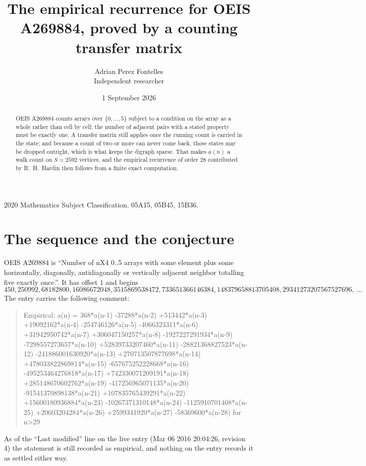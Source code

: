 \documentclass[11pt,a4paper]{article}
\title{The empirical recurrence for OEIS A269884, proved by a counting transfer matrix}
\author{Adrian Perez Fontelles\\ \small Independent researcher}
\date{1 September 2026}
\theoremstyle{plain}
\theoremstyle{definition}
\begin{document}
\maketitle

\begin{abstract}
OEIS A269884 counts arrays over $\{0,\dots,5\}$ subject to a condition on the array as a
whole rather than cell by cell: the number of adjacent pairs with a stated property must be
exactly one. A transfer matrix still applies once the running count is carried in the state; and
because a count of two or more can never come back, those states may be dropped outright,
which is what keeps the digraph sparse. That makes $a(n)$ a walk count on $S=2592$ vertices,
and the empirical recurrence of order $28$ contributed by R.~H.~Hardin then follows from
a finite exact computation.
\end{abstract}

\noindent\small 2020 Mathematics Subject Classification. 05A15, 05B45, 15B36.\normalsize

\section{The sequence and the conjecture}

OEIS A269884 is ``Number of nX4 0..5 arrays with some element plus some horizontally, diagonally, antidiagonally or vertically adjacent neighbor totalling five exactly once.''. It has offset $1$ and begins
\[
450, 250992, 68182800, 16086672048, 3515869538472, 733651366146384, 148379658813705408, 29341273207567527696,\ \dots
\]
The entry carries the following comment:
\begin{quote}\small
Empirical: a(n) = 368*a(n-1) -37288*a(n-2) +513442*a(n-3) +19092162*a(n-4) -254746126*a(n-5) -4066323311*a(n-6) +31942950742*a(n-7) +306047150257*a(n-8) -1927227291934*a(n-9) -7298557273657*a(n-10) +52839733207460*a(n-11) -28821368827523*a(n-12) -241886001630920*a(n-13) +270713507877698*a(n-14) +478033822869814*a(n-15) -657675252228668*a(n-16) -495253464276818*a(n-17) +742330071209191*a(n-18) +285148670602762*a(n-19) -417256965071135*a(n-20) -91541370898138*a(n-21) +107835765439291*a(n-22) +15600180936884*a(n-23) -10267371310148*a(n-24) -1125910701408*a(n-25) +20603204284*a(n-26) +2599341920*a(n-27) -58369600*a(n-28) for n>29
\end{quote}
As of the ``Last modified'' line on the live entry (Mar 06 2016 20:04:26, revision 4) the statement is
still recorded as empirical, and nothing on the entry records it as settled either way.
\end{document}
